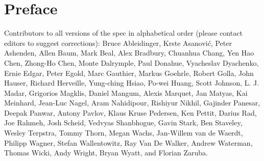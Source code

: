 \chapter{Preface}


Contributors to all versions of the spec in alphabetical order (please contact
editors to suggest corrections):
Bruce Ableidinger,
Krste Asanovi\'{c},
Peter Ashenden,
Allen Baum,
Mark Beal,
Alex Bradbury,
Chuanhua Chang,
Yen Hao Chen,
Zhong-Ho Chen,
Monte Dalrymple,
Paul Donahue,
Vyacheslav Dyachenko,
Ernie Edgar,
Peter Egold,
Marc Gauthier,
Markus Goehrle,
Robert Golla,
John Hauser,
Richard Herveille,
Yung-ching Hsiao,
Po-wei Huang,
Scott Johnson,
L. J. Madar,
Grigorios Magklis,
Daniel Mangum,
Alexis Marquet,
Jan Matyas,
Kai Meinhard,
Jean-Luc Nagel,
Aram Nahidipour,
Rishiyur Nikhil,
Gajinder Panesar,
Deepak Panwar,
Antony Pavlov,
Klaus Kruse Pedersen,
Ken Pettit,
Darius Rad,
Joe Rahmeh,
Josh Scheid,
Vedvyas Shanbhogue,
Gavin Stark,
Ben Staveley,
Wesley Terpstra,
Tommy Thorn,
Megan Wachs,
Jan-Willem van de Waerdt,
Philipp Wagner,
Stefan Wallentowitz,
Ray Van De Walker,
Andrew Waterman,
Thomas Wicki,
Andy Wright,
Bryan Wyatt,
and Florian Zaruba.
